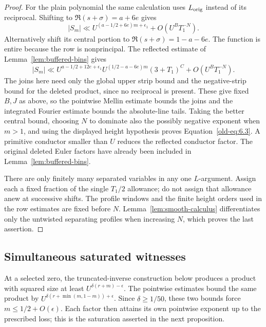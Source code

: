 \documentclass[11pt,a4paper]{article}
\numberwithin{equation}{section}
\numberwithin{figure}{section}
\theoremstyle{definition}
\theoremstyle{remark}
\begin{document}
\begin{proof}
For the plain polynomial the same calculation uses
\(L_{\rm orig}\) instead of its reciprocal.  Shifting to
\(\Re(s+\sigma)=a+6e\) gives
\[
 |S_m|\ll U^{(a-1/2+6e)m+\epsilon_1}
          +O(U^B T_1^{-N}).
\]
Alternatively shift its central portion to
\(\Re(s+\sigma)=1-a-6e\).  The function is entire because the
row is nonprincipal.  The reflected estimate of
Lemma~\ref{lem:buffered-bins} gives
\[
 |S_m|\ll
 U^{a-1/2+12e+\epsilon_1}
 U^{(1/2-a-6e)m}(3+T_1)^C
 +O(U^B T_1^{-N}).
\]
The joins here need only the global upper strip bound and the
negative-strip bound for the deleted product, since no reciprocal
is present.  These give fixed \(B,J\) as above, so the pointwise
Mellin estimate bounds the joins and the integrated Fourier estimate
bounds the absolute-line tails.  Taking the better central bound,
choosing \(N\) to
dominate also the possibly negative exponent when \(m>1\), and
using the displayed height hypothesis proves
Equation~\eqref{old-eq:6.3}.  A primitive conductor smaller than
\(U\) reduces the reflected conductor factor.  The original deleted
Euler factors have already been included in
Lemma~\ref{lem:buffered-bins}.

There are only finitely many separated variables in any one
\(L\)-argument.  Assign each a fixed fraction of the single
\(T_1/2\) allowance; do not assign that allowance anew at successive
shifts.  The profile windows and the finite height orders used in the
row estimates are fixed before \(N\).  Lemma~\ref{lem:smooth-calculus} differentiates only the
untwisted separating profiles when increasing \(N\), which proves
the last assertion.
\end{proof}

\subsection{Simultaneous saturated witnesses}

At a selected zero, the truncated-inverse construction below produces
a product with squared size at least $U^{\delta(r+m)-\epsilon}$.
The pointwise estimates bound the same product by
$U^{\delta(r+\min(m,1-m))+\epsilon}$. Since $\delta\ge1/50$,
these two bounds force $m\le1/2+O(\epsilon)$. Each factor then
attains its own pointwise exponent up to the prescribed loss; this
is the saturation asserted in the next proposition.
\end{document}
